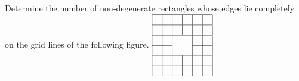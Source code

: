 Determine the number of non-degenerate rectangles whose edges lie completely on the grid lines of the following figure.
$ \begin{tabular}{|c|c|c|c|c|c|} \hline & & & & & \\
\hline & & & & & \\
\hline & & \multicolumn{1}{c}{} & & & \\
\cline{1 - 2}\cline{5 - 6} & & \multicolumn{1}{c}{} & & & \\
\hline & & & & & \\
\hline & & & & & \\
\hline \end{tabular}$